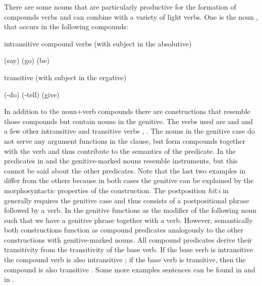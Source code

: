 There are some nouns that are particularly productive for the formation of compounds verbs and can combine with a variety of light verbs. One is the noun  , that occurs in the following compounds:
%
\begin{exe}
	\ex	intransitive compound verbs (with subject in the absolutive)	\label{ex:wordcompoundsintransitive}
	\begin{xlist}
		\ex	{}  (say)  
		\ex	{}  (go)  
		\ex	{}  (be)  
	\end{xlist}

	\ex	transitive (with subject in the ergative)	\label{ex:wordcompoundstransitive}
	\begin{xlist}
		\ex	{}  (-do) \sqt{say, tell} 
		\ex	{}  (-tell) \sqt{say, tell} 
		\ex	{}  (give) \sqt{promise}
	\end{xlist}
\end{exe}

In addition to the noun+verb compounds there are constructions that resemble those compounds but contain nouns in the genitive. The verbs used are   and   and a few other intransitive and transitive verbs ,  . The nouns in the genitive case do not serve any argument functions in the clause, but form compounds together with the verb and thus contribute to the semantics of the predicate. In the predicates in  and  the genitive-marked nouns resemble instruments, but this cannot be said about the other predicates. Note that the last two examples in  differ from the others because in both cases the genitive can be explained by the morphosyntactic properties of the construction. The postposition \textit{hitːi} in  generally requires the genitive case and thus  consists of a postpositional phrase followed by a verb. In  the genitive functions as the modifier of the following noun such that we have a genitive phrase together with a verb. However, semantically both constructions function as compound predicates analogously to the other constructions with genitive-marked nouns. All compound predicates derive their transitivity from the transitivity of the base verb. If the base verb is intransitive the compound verb is also intransitive  ; if the base verb is transitive, then the compound is also transitive . Some more examples sentences can be found in  and in . 

